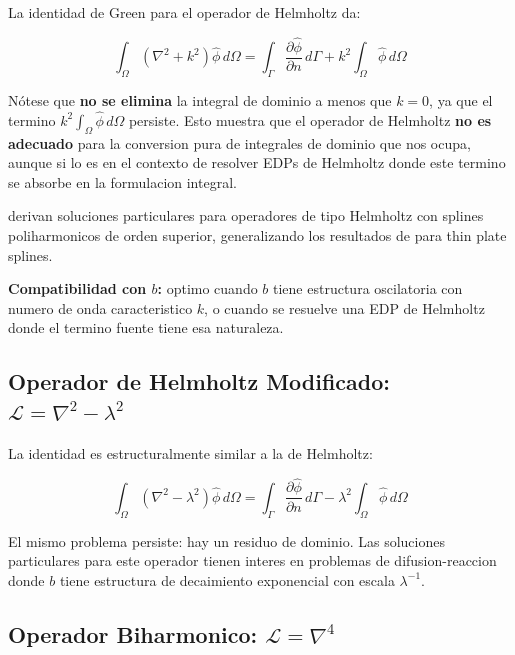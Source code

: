 \documentclass[12pt,a4paper]{article}
\begin{document}
La identidad de Green para el operador de Helmholtz da:

\begin{equation}
    \int_\Omega (\nabla^2 + k^2)\hat{\phi}\, d\Omega
    = \int_\Gamma \frac{\partial\hat{\phi}}{\partial n}\, d\Gamma
    + k^2 \int_\Omega \hat{\phi}\, d\Omega
\end{equation}

Nótese que \textbf{no se elimina} la integral de dominio a menos que $k = 0$,
ya que el termino $k^2\int_\Omega\hat{\phi}\,d\Omega$ persiste. Esto muestra
que el operador de Helmholtz \textbf{no es adecuado} para la conversion pura
de integrales de dominio que nos ocupa, aunque si lo es en el contexto de
resolver EDPs de Helmholtz donde este termino se absorbe en la formulacion
integral.

\cite{muleshkov1999helmholtz} derivan soluciones particulares para operadores
de tipo Helmholtz con splines poliharmonicos de orden superior, generalizando
los resultados de \cite{golberg1999annihilator} para thin plate splines.

\textbf{Compatibilidad con $b$:} optimo cuando $b$ tiene estructura oscilatoria
con numero de onda caracteristico $k$, o cuando se resuelve una EDP de Helmholtz
donde el termino fuente tiene esa naturaleza.

\subsection{Operador de Helmholtz Modificado: $\mathcal{L} = \nabla^2 - \lambda^2$}

La identidad es estructuralmente similar a la de Helmholtz:

\begin{equation}
    \int_\Omega (\nabla^2 - \lambda^2)\hat{\phi}\, d\Omega
    = \int_\Gamma \frac{\partial\hat{\phi}}{\partial n}\, d\Gamma
    - \lambda^2 \int_\Omega \hat{\phi}\, d\Omega
\end{equation}

El mismo problema persiste: hay un residuo de dominio. Las soluciones
particulares para este operador tienen interes en problemas de difusion-reaccion
donde $b$ tiene estructura de decaimiento exponencial con escala $\lambda^{-1}$.

\subsection{Operador Biharmonico: $\mathcal{L} = \nabla^4$}
\end{document}
